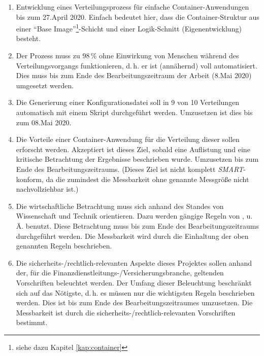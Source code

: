\begin{enumerate}
	\item Entwicklung eines Verteilungsprozess für einfache Container-Anwendungen bis zum 27.April 2020. Einfach bedeutet hier, dass die Container-Struktur aus einer \enquote{Base Image}\footnote{siehe dazu Kapitel \vref{kap:container}}-Schicht und einer Logik-Schnitt (Eigenentwicklung) besteht.
	\item Der Prozess muss zu 98\,\% ohne Einwirkung von Menschen während des Verteilungsvorgangs funktionieren, d.\,h. er ist (annähernd) voll automatisiert. Dies muss bis zum Ende des Bearbeitungszeitraum der Arbeit (8.Mai 2020) umgesetzt werden.
	\item Die Generierung einer Konfigurationsdatei soll in 9 von 10 Verteilungen automatisch mit einem Skript durchgeführt werden. Umzusetzen ist dies bis zum 08.Mai 2020.
	\item Die Vorteile einer Container-Anwendung für die Verteilung dieser sollen erforscht werden. Akzeptiert ist dieses Ziel, sobald eine Auflistung und eine kritische Betrachtung der Ergebnisse beschrieben wurde. Umzusetzen bis zum Ende des Bearbeitungszeitraums. (Dieses Ziel ist nicht komplett \textit{SMART}-konform, da die zumindest die Messbarkeit ohne genannte Messgröße nicht nachvollziehbar ist.)
	\item Die wirtschaftliche Betrachtung muss sich anhand des Standes von Wissenschaft und Technik orientieren. Dazu werden gängige Regeln von \cite{herman_is_2009}, \cite{brugger_it_2009} u.\,Ä. benutzt. Diese Betrachtung muss bis zum Ende des Bearbeitungszeitraums durchgeführt werden. Die Messbarkeit wird durch die Einhaltung der oben genannten Regeln beschrieben.
	\item Die sicherheits-/rechtlich-relevanten Aspekte dieses Projektes sollen anhand der, für die Finanzdienstleitungs-/Versicherungsbranche, geltenden Vorschriften beleuchtet werden. Der Umfang dieser Beleuchtung beschränkt sich auf das Nötigste, d.\,h. es müssen nur die wichtigsten Regeln beschrieben werden. Dies ist bis zum Ende des Bearbeitungszeitraumes umzusetzen. Die Messbarkeit ist durch die sicherheits-/rechtlich-relevanten Vorschriften bestimmt.
\end{enumerate}

